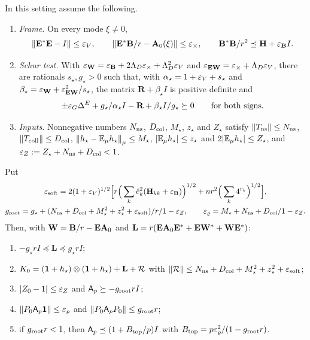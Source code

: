 \begin{theorem}\label{thm:record:direct-star}
In this setting assume the following.
\begin{enumerate}[label=\textup{(H\arabic*)}]
\item\label{it:record:star-H1} \emph{Frame.} On every mode $\xi\ne0$,
  \[
    \left\|\mathbf E^*\mathbf E-I\right\|\le\varepsilon_V,\qquad
    \left\|\mathbf E^*\mathbf B/r-\mathbf A_{0}(\xi)\right\|\le\varepsilon_\times,\qquad
    \mathbf B^*\mathbf B/r^2\preceq\mathbf H+\varepsilon_{\mathbf B}I .
  \]
\item\label{it:record:star-H2} \emph{Schur test.} With
  $\varepsilon_{\mathbf W}=\varepsilon_{\mathbf B}+2\Lambda_D\varepsilon_\times+\Lambda_D^2\varepsilon_V$ and
  $\varepsilon_{\mathbf{EW}}=\varepsilon_\times+\Lambda_D\varepsilon_V$, there are rationals $s_\star,g_\star>0$ such
  that, with $\alpha_\star=1+\varepsilon_V+s_\star$ and $\beta_\star=\varepsilon_{\mathbf W}+\varepsilon_{\mathbf{EW}}^2/s_\star$,
  the matrix $\mathbf R+\beta_\star I$ is positive definite and
  \begin{equation}\label{eq:record:schur}
    \pm\varepsilon_G\Delta^E+g_\star/\alpha_\star I-\mathbf R+\beta_\star I/g_\star\succeq0
    \qquad\text{for both signs}.
  \end{equation}
\item\label{it:record:star-H3} \emph{Inputs.} Nonnegative numbers $N_{\rm ns}$, $D_{\rm col}$,
  $M_\star$, $z_\star$ and $Z_\star$ satisfy $\left\|T_{\rm ns}\right\|\le N_{\rm ns}$, $\left\|T_{\rm coll}\right\|\le D_{\rm col}$,
  $\left\|h_\star-\mathbb E_\mu h_\star\right\|_\mu\le M_\star$, $|\mathbb E_\mu h_\star|\le z_\star$ and
  $2|\mathbb E_\mu h_\star|\le Z_\star$, and $\varepsilon_Z:=Z_\star+N_{\rm ns}+D_{\rm col}<1$.
\end{enumerate}
Put
\begin{gather*}
  \varepsilon_{\rm soft}=2(1+\varepsilon_V)^{1/2}\Big[r\Big(\sum_k\hat e_k^2(\mathbf H_{kk}+\varepsilon_{\mathbf B})\Big)^{1/2}
  +nr^2\Big(\sum_k4^{r_k}\Big)^{1/2}\Big],\\
  g_{\rm root}=g_\star+(N_{\rm ns}+D_{\rm col}+M_\star^2+z_\star^2+\varepsilon_{\rm soft})/r/1-\varepsilon_Z,
  \qquad
  \varepsilon_\varrho=M_\star+N_{\rm ns}+D_{\rm col}/1-\varepsilon_Z.
\end{gather*}
Then, with $\mathbf W=\mathbf B/r-\mathbf E\mathbf A_{0}$ and
$\mathbf L=r(\mathbf E\mathbf A_{0}\mathbf E^*+\mathbf E\mathbf W^*+\mathbf W\mathbf E^*)$:
\begin{enumerate}[label=\textup{(\alph*)}]
\item $-g_\star rI\preceq\mathbf L\preceq g_\star rI$;
\item $K_0=(\mathbf 1+h_\star)\otimes(\mathbf 1+h_\star)+\mathbf L+\mathcal R$ with
  $\left\|\mathcal R\right\|\le N_{\rm ns}+D_{\rm col}+M_\star^2+z_\star^2+\varepsilon_{\rm soft}$;
\item $|Z_0-1|\le\varepsilon_Z$ and $\mathsf A_p\succeq-g_{\rm root}rI$;
\item $\left\|P_0\mathsf A_p\mathbf 1\right\|\le\varepsilon_\varrho$ and $\left\|P_0\mathsf A_p P_0\right\|\le g_{\rm root}r$;
\item if $g_{\rm root}r<1$, then $\mathsf A_p\preceq(1+B_{\rm top}/p)I$ with
  $B_{\rm top}=p\varepsilon_\varrho^2/(1-g_{\rm root}r)$.
\end{enumerate}
\end{theorem}

